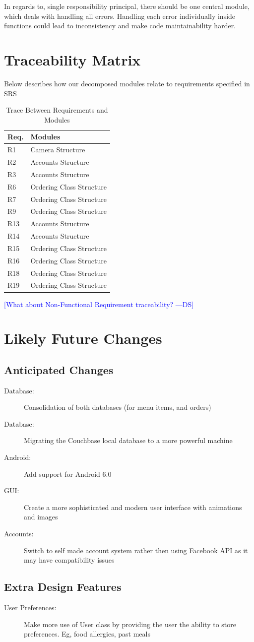 \documentclass[12pt, titlepage]{article}
\newcommand{\authornote}[3]{\textcolor{#1}{[#3 ---#2]}}
\newcommand{\authornote}[3]{}
\newcommand{\ds}[1]{\authornote{blue}{DS}{#1}}
\begin{document}
In regards to, single responsibility principal, there should be one central module, which deals with handling all errors. Handling each error individually inside functions could lead to inconsistency and make code maintainability harder. 

\section{Traceability Matrix}
Below describes how our decomposed modules relate to requirements specified in SRS
\begin{table}[H]
\centering
\begin{tabular}{p{} p{}}
\toprule
\textbf{Req.} & \textbf{Modules}\\
\midrule
R1 & Camera Structure\\
R2 & Accounts Structure\\
R3 & Accounts Structure\\
R6 & Ordering Class Structure\\
R7 & Ordering Class Structure\\
R9 & Ordering Class Structure\\
R13 & Accounts Structure \\
R14 & Accounts Structure\\
R15 & Ordering Class Structure\\
R16 & Ordering Class Structure\\
R18 & Ordering Class Structure\\
R19 & Ordering Class Structure\\
\bottomrule
\end{tabular}
\caption{Trace Between Requirements and Modules}
\label{TblRT}
\end{table}

\ds{What about Non-Functional Requirement traceability?}

\section{Likely Future Changes}
\subsection{Anticipated Changes}
\begin{description}
  \item[Database:] Consolidation of both databases (for menu items, and orders)
  \item[Database:] Migrating the Couchbase local database to a more powerful machine
  \item[Android:] Add support for Android 6.0
  \item[GUI:] Create a more sophisticated and modern user interface with animations and images
  \item[Accounts:] Switch to self made account system rather then using Facebook API as it may have compatibility issues
 \end{description}
 
\subsection{Extra Design Features}
\begin{description}
  \item[User Preferences:] Make more use of User class by providing the user the ability to store preferences. Eg, food allergies, past meals
\end{description}
\end{document}
